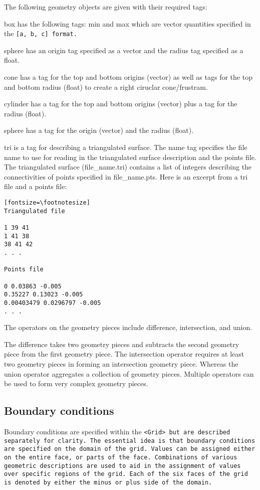 The following geometry objects are given with their required tags:

box has the following tags: min and max which are vector quantities
specified in the \tt [a, b, c] \normalfont format.

sphere has an origin tag specified as a vector and the radius tag
specified as a float.

cone has a tag for the top and bottom origins (vector) as well as tags for the
top and bottom radius (float) to create a right ciruclar cone/frustram.

cylinder has a tag for the top and bottom origins (vector) plus a tag
for the radius (float).

sphere has a tag for the origin (vector) and the radius (float).

tri is a tag for describing a triangulated surface.  The name tag
specifies the file name to use for reading in the triangulated surface
description and the points file.  The triangulated surface
(file\_name.tri) contains a list of integers describing the
connectivities of points specified in file\_name.pts.  Here is an
excerpt from a tri file and a points file:


\begin{verbatim}[fontsize=\footnotesize]
Triangulated file

1 39 41
1 41 38
38 41 42
. . .

Points file

0 0.03863 -0.005
0.35227 0.13023 -0.005
0.00403479 0.0296797 -0.005
. . .

\end{verbatim}


The operators on the geometry pieces include difference, intersection,
and union.

The difference takes two geometry pieces and subtracts the second
geometry piece from the first geometry piece.  The intersection
operator requires at least two geometry pieces in forming an
intersection geometry piece.  Whereas the union operator aggregates a
collection of geometry pieces.  Multiple operators can be used to form
very complex geometry pieces.



\subsection{Boundary conditions}

Boundary conditions are specified within the \tt <Grid> \normalfont
but are described separately for clarity.  The essential idea is that
boundary conditions are specified on the domain of the grid.  Values
can be assigned either on the entire face, or parts of the face.
Combinations of various geometric descriptions are used to aid in the
assignment of values over specific regions of the grid.  Each of the
six faces of the grid is denoted by either the minus or plus side of
the domain.

